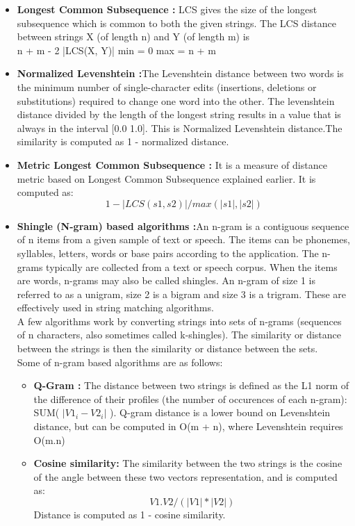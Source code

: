 \begin{itemize}
    \item \textbf{Longest Common Subsequence :} LCS gives the size of the longest subsequence which is common to both the given strings.
    The LCS distance between strings X (of length n) and Y (of length m) is \\  n + m - 2 |LCS(X, Y)| min = 0 max = n + m
    \item \textbf{Normalized Levenshtein :}The Levenshtein distance between two words is the minimum number of single-character edits (insertions, deletions or substitutions) required to change one word into the other.
    The levenshtein distance divided by the length of the longest string results in a value that is always in the interval [0.0 1.0]. This is Normalized Levenshtein distance.The similarity is computed as 1 - normalized distance.
    
    \item \textbf{Metric Longest Common Subsequence :} It is a measure of distance metric based on Longest Common Subsequence explained earlier. It is computed as: \\
    \begin{equation}
     1 - |LCS(s1, s2)| / max(|s1|, |s2|)
     \end{equation}
    \item \textbf{Shingle (N-gram) based algorithms :}An n-gram is a contiguous sequence of n items from a given sample of text or speech. The items can be phonemes, syllables, letters, words or base pairs according to the application. The n-grams typically are collected from a text or speech corpus. When the items are words, n-grams may also be called shingles. An n-gram of size 1 is referred to as a unigram, size 2 is a bigram and size 3 is a trigram. These are effectively used in string matching algorithms.\\ 
    A few algorithms work by converting strings into sets of n-grams (sequences of n characters, also sometimes called k-shingles). The similarity or distance between the strings is then the similarity or distance between the sets.
    \\ Some of n-gram based algorithms are as follows: 
    \begin{itemize}
        \item \textbf{Q-Gram : }The distance between two strings is defined as the L1 norm of the difference of their profiles (the number of occurences of each n-gram): SUM( $|V1_i - V2_i|$ ). Q-gram distance is a lower bound on Levenshtein distance, but can be computed in O(m + n), where Levenshtein requires O(m.n)
        \item \textbf{Cosine similarity: }The similarity between the two strings is the cosine of the angle between these two vectors representation, and is computed as: \\
        \begin{equation}
        V1 . V2 / (|V1| * |V2|) 
        \end{equation}
        Distance is computed as 1 - cosine similarity.


\end{itemize}
\end{itemize}
